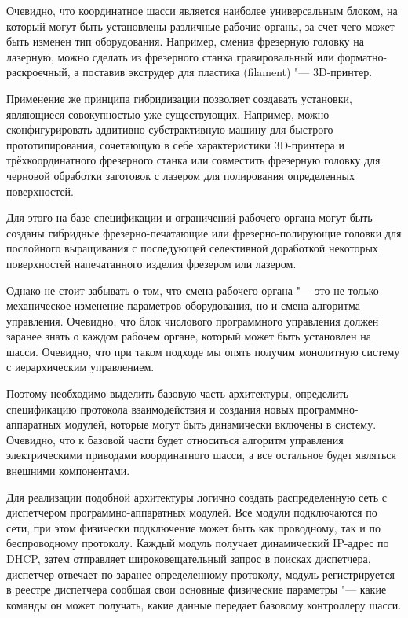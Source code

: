 Очевидно, что координатное шасси является наиболее универсальным блоком, на который могут быть установлены различные рабочие органы, за счет чего может быть изменен тип оборудования. Например, сменив фрезерную головку на лазерную, можно сделать из фрезерного станка гравировальный или форматно-раскроечный, а поставив экструдер для пластика (filament) "--- 3D-принтер.

Применение же принципа гибридизации позволяет создавать установки, являющиеся совокупностью уже существующих. Например, можно сконфигурировать аддитивно-субстрактивную машину для быстрого прототипирования, сочетающую в себе характеристики 3D-принтера и трёхкоординатного фрезерного станка или совместить фрезерную головку для черновой обработки заготовок с лазером для полирования определенных поверхностей.

Для этого на базе спецификации и ограничений рабочего органа могут быть созданы гибридные фрезерно-печатающие или фрезерно-полирующие головки  для послойного выращивания с последующей селективной доработкой некоторых поверхностей напечатанного изделия фрезером или лазером.

Однако не стоит забывать о том, что смена рабочего органа "--- это не только механическое изменение параметров оборудования, но и смена алгоритма управления. Очевидно, что блок числового программного управления должен заранее знать о каждом рабочем органе, который может быть установлен на шасси. Очевидно, что при таком подходе мы опять получим монолитную систему с иерархическим управлением.

Поэтому необходимо выделить базовую часть архитектуры, определить спецификацию протокола взаимодействия и создания новых программно-аппаратных модулей, которые могут быть динамически включены в систему. Очевидно, что к базовой части будет относиться алгоритм управления электрическими приводами координатного шасси, а все остальное будет являться внешними компонентами.

Для реализации подобной архитектуры логично создать распределенную сеть с диспетчером программно-аппаратных модулей. Все модули подключаются по сети, при этом физически подключение может быть как проводному, так и по беспроводному протоколу. Каждый модуль получает динамический IP-адрес по DHCP, затем отправляет широковещательный запрос в поисках диспетчера, диспетчер отвечает по заранее определенному протоколу, модуль регистрируется в реестре диспетчера сообщая свои основные физические параметры "--- какие команды он может получать, какие данные передает базовому контроллеру шасси.

